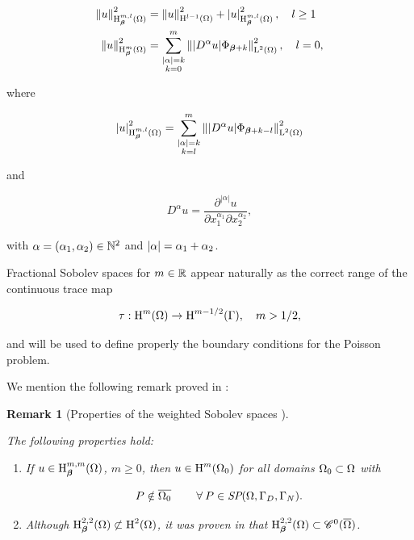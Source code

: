 \documentclass[a4paper,11pt]{article}
\newtheorem{remark}[theorem]{Remark}
\begin{document}
{\begin{equation}\label{eq:weighted_sobolev_norms}
\begin{split}
\left\|u\right\|^{2}_{\operatorname H^{m,l}_{\boldsymbol \beta}(\Omega)} &= \left\|u\right\|^{2}_{\operatorname H^{l-1}(\Omega)} +   \left|u\right|^{2}_{\operatorname H^{m,l}_{\boldsymbol \beta}(\Omega)}, \quad l \geq 1\\ 
\left\|u\right\|^{2}_{\operatorname H^{m}_{\boldsymbol \beta}(\Omega)} &= \sum_{\substack{|\alpha| = k \\ k=0}}^{m} \left\||D^{\alpha}u| \Phi_{\boldsymbol \beta + k}\right\|^{2}_{\operatorname L^{2}(\Omega)}, \quad  l = 0,
\end{split}
\end{equation}


where

$$\left|u\right|^{2}_{\operatorname H^{m,l}_{\boldsymbol \beta}(\Omega)} = \sum_{\substack{|\alpha| = k \\ k=l}}^{m} \left\||D^{\alpha}u| \Phi_{\boldsymbol \beta + k - l}\right\|^{2}_{\operatorname L^{2}(\Omega)}$$

and

$$D^{\alpha}u = \frac{\partial^{|\alpha|} u}{\partial x_{1}^{\alpha_{1}} \partial x_{2}^{\alpha_{2}}},$$


with $\alpha = (\alpha_{1},\alpha_{2}) \in \mathbb N^{2}$ and $\left|\alpha\right| = \alpha_{1} + \alpha_{2}$. 

Fractional Sobolev spaces for $m \in \mathbb R$  appear naturally as the correct range of the continuous trace map

$$ \tau: \operatorname H^{m}(\Omega) \rightarrow \operatorname H^{m - 1/2}(\Gamma), \quad m > 1/2, $$

and will be used to define properly the boundary conditions for the Poisson problem.

We mention the following remark proved in \cite{Wihler:2003}:

\begin{remark}[Properties of the weighted Sobolev spaces {\cite[Remark 1.2.2]{Wihler:2003}}]
\label{remark:properties_sob_spaces}

The following properties hold:

\begin{enumerate}

    \item  If  $u \in \operatorname H^{m,m}_{\boldsymbol \beta}(\Omega)$, $m\geq0$, then $u \in \operatorname H^{m}(\Omega_{0})$ for all domains $\Omega_{0} \subset \Omega$ with
    
    $$ P \notin \overline{\Omega_{0}} \quad  \quad\:\forall\: P \in  \textit{SP}(\Omega,\Gamma_{D},\Gamma_{N}).$$
    
    \item Although $\operatorname H^{2,2}_{\boldsymbol \beta}(\Omega) \not \subset \operatorname H^{2}(\Omega)$, it was proven in \cite{BKP:1979} that $\operatorname H^{2,2}_{\boldsymbol \beta}(\Omega) \subset \mathscr C^{0}(\overline{\Omega})$.
    

\end{enumerate}
\end{remark}}
\end{document}
